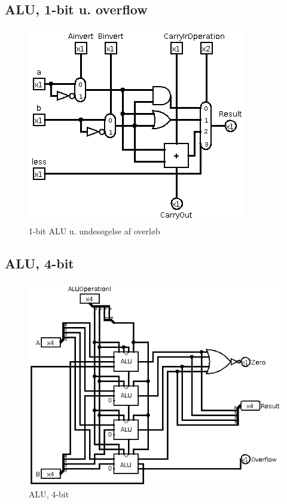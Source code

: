 \documentclass[10pt,a4paper,danish]{article}
\begin{document}
\subsection{ALU, 1-bit u. overflow}
\begin{figure}[htb]
\begin{center}
\leavevmode
\includegraphics[scale=0.70]{alu-1bit.png}
\end{center}
\caption{1-bit ALU u. undesøgelse af overløb}
\label{fig:alu-1bit}
\end{figure}

\subsection{ALU, 4-bit}
\begin{figure}[htb]
\begin{center}
\leavevmode
\includegraphics[scale=0.70]{circ2.png}
\end{center}
\caption{ALU, 4-bit}
\label{fig:circ2}
\end{figure}
\end{document}

